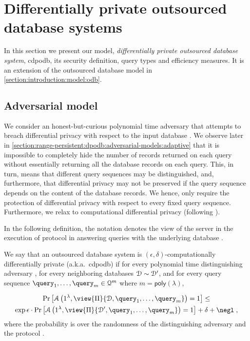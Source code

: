 \section{Differentially private outsourced database systems}\label{section:range-persistent:dpodb}

	In this section we present our model, \emph{differentially private outsourced database system}, \acrshort{cdpodb}, its security definition, query types and efficiency measures.
	It is an extension of the outsourced database model in \cref{section:introduction:model:odb}.

	\subsection{Adversarial model}\label{section:range-persistent:dpodb:adversarial-models}

		We consider an honest-but-curious polynomial time adversary that attempts to breach differential privacy with respect to the input database \database{}.
		We observe later in \cref{section:range-persistent:dpodb:adversarial-models:adaptive} that it is impossible to completely hide the number of records returned on each query without essentially returning all the database records on each query.
		This, in turn, means that different query sequences may be distinguished, and, furthermore, that differential privacy may not be preserved if the query sequence depends on the content of the database records.
		We hence, only require the protection of differential privacy with respect to every fixed query sequence.
		Furthermore, we relax to computational differential privacy (following \cite{computational-dp}).

		In the following definition, the notation  denotes the view of the server \server{} in the execution of protocol \protocol{} in answering queries  with the underlying database \database{}.

		\begin{definition}
			We say that an outsourced database system \protocol{} is $(\epsilon, \delta)$-computationally differentially private (a.k.a.~\acrshort{cdpodb}) if for every polynomial time distinguishing adversary \adversary{}, for every neighboring databases $\mathcal{D} \sim \mathcal{D}^\prime$, and for every query sequence $\fromNtoM{\query}{1}{m} \in \querySet^m$ where $m = \mathsf{poly}(\lambda)$,

			\begin{multline*}
				\probability{\adversary \left( 1^\lambda, \view{\protocol{}}{\database, \fromNtoM{\query}{1}{m}} \right) = 1 } \leq \\
				\exp{\epsilon} \cdot \probability{\adversary \left( 1^\lambda, \view{\protocol{}}{\database^\prime, \fromNtoM{\query}{1}{m}} \right) = 1} + \delta +\negl \; ,
			\end{multline*}
			where the probability is over the randomness of the distinguishing adversary \adversary{} and the protocol \protocol{}.
		\end{definition}

